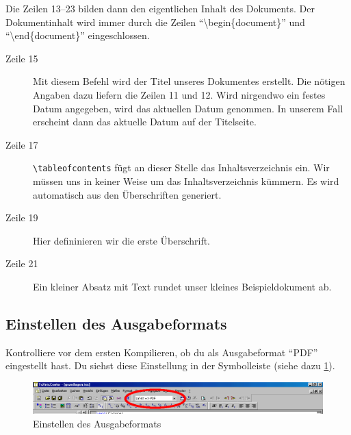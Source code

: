 Die Zeilen 13--23 bilden dann den eigentlichen Inhalt des Dokuments. Der Dokumentinhalt wird immer durch die Zeilen \enquote{\textbackslash begin\{document\}} und \enquote{\textbackslash end\{document\}} eingeschlossen.

\begin{description}
\item[Zeile 15] Mit diesem Befehl wird der Titel unseres Dokumentes erstellt. Die nötigen Angaben dazu liefern die Zeilen 11 und 12. Wird nirgendwo ein festes Datum angegeben, wird das aktuellen Datum genommen. In unserem Fall erscheint dann das aktuelle Datum auf der Titelseite.
\item[Zeile 17] \texttt{\textbackslash tableofcontents} fügt an dieser Stelle das Inhaltsverzeichnis ein. Wir müssen uns in keiner Weise um das Inhaltsverzeichnis kümmern. Es wird automatisch aus den Überschriften generiert.
\item[Zeile 19] Hier defininieren wir die erste Überschrift.
\item[Zeile 21] Ein kleiner Absatz mit Text rundet unser kleines Beispieldokument ab.
\end{description}

\subsection{Einstellen des Ausgabeformats}

Kontrolliere vor dem ersten Kompilieren, ob du als Ausgabeformat \enquote{PDF} eingestellt hast. Du siehst diese Einstellung in der Symbolleiste (siehe dazu \cref{fig:beispiel1_03}).

\begin{figure}[ht]
	\begin{center}
		\includegraphics[width=\linewidth]{images/beispiel1_03.png}
	\end{center}
	\caption{Einstellen des Ausgabeformats}
	\label{fig:beispiel1_03}
\end{figure}

